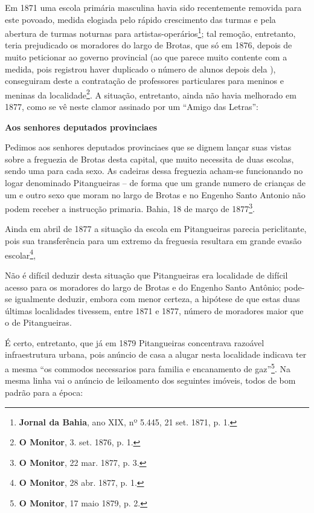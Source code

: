 Em 1871 uma escola primária masculina havia sido recentemente removida para este povoado, medida elogiada pelo rápido crescimento das turmas e pela abertura de turmas noturnas para artistas-operários\footnote{\textbf{Jornal da Bahia}, ano XIX, nº 5.445, 21 set. 1871, p. 1.}; tal remoção, entretanto, teria prejudicado os moradores do largo de Brotas, que só em 1876, depois de muito peticionar ao governo provincial (ao que parece muito contente com a medida, pois registrou haver duplicado o número de alunos depois dela \cite[relat.~instrução~pública,~p.~25]{bahia_1872}), conseguiram deste a contratação de professores particulares para meninos e meninas da localidade\footnote{\textbf{O Monitor}, 3. set. 1876, p. 1.}. A situação, entretanto, ainda não havia melhorado em 1877, como se vê neste clamor assinado por um ``Amigo das Letras'':

\begin{citacao}
\textbf{Aos senhores deputados provinciaes}

Pedimos aos senhores deputados provinciaes que se dignem lançar suas vistas sobre a freguezia de Brotas desta capital, que muito necessita de duas escolas, sendo uma para cada sexo. As cadeiras dessa freguezia acham-se funcionando no logar denominado Pitangueiras -- de forma que um grande numero de crianças de um e outro sexo que moram no largo de Brotas e no Engenho Santo Antonio não podem receber a instrucção primaria.
Bahia, 18 de março de 1877\footnote{\textbf{O Monitor}, 22 mar. 1877, p. 3.}.
\end{citacao}

Ainda em abril de 1877 a situação da escola em Pitangueiras parecia periclitante, pois sua transferência para um extremo da freguesia resultara em grande evasão escolar\footnote{\textbf{O Monitor}, 28 abr. 1877, p. 1.},

Não é difícil deduzir desta situação que Pitangueiras era localidade de difícil acesso para os moradores do largo de Brotas e do Engenho Santo Antônio; pode-se igualmente deduzir, embora com menor certeza, a hipótese de que estas duas últimas localidades tivessem, entre 1871 e 1877, número de moradores maior que o de Pitangueiras. 

É certo, entretanto, que já em 1879 Pitangueiras concentrava razoável infraestrutura urbana, pois anúncio de casa a alugar nesta localidade indicava ter a mesma ``os commodos necessarios para familia e encanamento de gaz''\footnote{\textbf{O Monitor}, 17 maio 1879, p. 2.}. Na mesma linha vai o anúncio de leiloamento dos seguintes imóveis, todos de bom padrão para a época:

